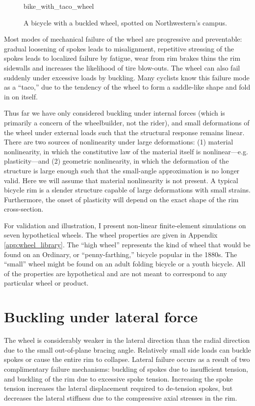 \documentclass[\rootdir/thesis.tex]{subfiles}
\begin{document}
\begin{figure}[b]
\centering
{bike_with_taco_wheel}
\caption{A bicycle with a buckled wheel, spotted on Northwestern's campus.}
\label{fig:bike_taco_wheel}
\end{figure}

Most modes of mechanical failure of the wheel are progressive and preventable: gradual loosening of spokes leads to misalignment, repetitive stressing of the spokes leads to localized failure by fatigue, wear from rim brakes thins the rim sidewalls and increases the likelihood of tire blow-outs. The wheel can also fail suddenly under excessive loads by buckling. Many cyclists know this failure mode as a ``taco,'' due to the tendency of the wheel to form a saddle-like shape and fold in on itself.

Thus far we have only considered buckling under internal forces (which is primarily a concern of the wheelbuilder, not the rider), and small deformations of the wheel under external loads such that the structural response remains linear. There are two sources of nonlinearity under large deformations: (1) material nonlinearity, in which the constitutive law of the material itself is nonlinear---e.g. plasticity---and (2) geometric nonlinearity, in which the deformation of the structure is large enough such that the small-angle approximation is no longer valid. Here we will assume that material nonlinearity is not present. A typical bicycle rim is a slender structure capable of large deformations with small strains. Furthermore, the onset of plasticity will depend on the exact shape of the rim cross-section.

For validation and illustration, I present non-linear finite-element simulations on seven hypothetical wheels. The wheel properties are given in Appendix \ref{app:wheel_library}. The ``high wheel'' represents the kind of wheel that would be found on an Ordinary, or ``penny-farthing,'' bicycle popular in the 1880s. The ``small'' wheel might be found on an adult folding bicycle or a youth bicycle. All of the properties are hypothetical and are not meant to correspond to any particular wheel or product.


\section{Buckling under lateral force}
\label{sec:buckling_lat_force}

The wheel is considerably weaker in the lateral direction than the radial direction due to the small out-of-plane bracing angle. Relatively small side loads can buckle spokes or cause the entire rim to collapse. Lateral failure occurs as a result of two complimentary failure mechanisms: buckling of spokes due to insufficient tension, and buckling of the rim due to excessive spoke tension. Increasing the spoke tension increases the lateral displacement required to de-tension spokes, but decreases the lateral stiffness due to the compressive axial stresses in the rim.
\end{document}
